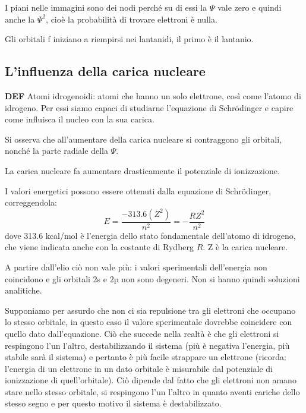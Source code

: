 I piani nelle immagini sono dei nodi perché su di essi la $\Psi$ vale zero e quindi anche la $\Psi^2$, cioè la probabilità di trovare elettroni è nulla.

\vspace{0.2cm}Gli orbitali f iniziano a riempirsi nei lantanidi, il primo è il lantanio.

\subsection{L'influenza della carica nucleare}
\textbf{DEF} Atomi idrogenoidi: atomi che hanno un solo elettrone, così come l'atomo di idrogeno. Per essi siamo capaci di studiarne l'equazione di Schrödinger e capire come influisca il nucleo con la sua carica.

Si osserva che all'aumentare della carica nucleare si contraggono gli orbitali, nonché la parte radiale della $\Psi$.

La carica nucleare fa aumentare drasticamente il potenziale di ionizzazione.

I valori energetici possono essere ottenuti dalla equazione di Schrödinger, correggendola:
$$E=\frac{-313.6(Z^2)}{n^2}=-\frac{RZ^2}{n^2}$$
dove 313.6 kcal/mol è l'energia dello stato fondamentale dell'atomo di idrogeno, che viene indicata anche con la costante di Rydberg $R$. Z è la carica nucleare.

A partire dall'elio ciò non vale più: i valori sperimentali dell'energia non coincidono e gli orbitali 2s e 2p non sono degeneri. Non si hanno quindi soluzioni analitiche.

Supponiamo per assurdo che non ci sia repulsione tra gli elettroni che occupano lo stesso orbitale, in questo caso il valore sperimentale dovrebbe coincidere con quello dato dall'equazione. Ciò che succede nella realtà è che gli elettroni si respingono l'un l'altro, destabilizzando il sistema (più è negativa l'energia, più stabile sarà il sistema) e pertanto è più facile strappare un elettrone (ricorda: l'energia di un elettrone in un dato orbitale è misurabile dal potenziale di ionizzazione di quell'orbitale). Ciò dipende dal fatto che gli elettroni non amano stare nello stesso orbitale, si respingono l'un l'altro in quanto aventi cariche dello stesso segno e per questo motivo il sistema è destabilizzato.
